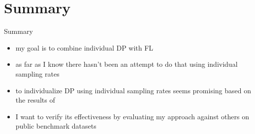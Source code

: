 \documentclass[aspectratio=169]{beamer}
\begin{document}
\section{Summary}

\begin{frame}{Summary}
    \begin{itemize}
        \item my goal is to combine individual DP with FL
        \item as far as I know there hasn't been an attempt to do that using individual sampling rates
        \item to individualize DP using individual sampling rates seems promising based on the results of \textcite{boenisch:2023}
        \item I want to verify its effectiveness by evaluating my approach against others on public benchmark datasets
    \end{itemize}    
\end{frame}
  





\end{document}

